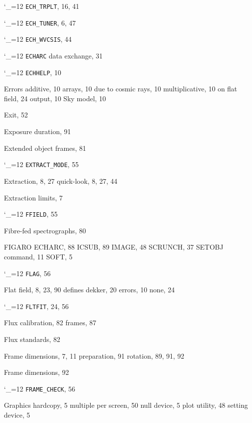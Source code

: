 \documentclass[11pt,twoside]{article}
\newcommand{\cmdname}{\begingroup \catcode`\_=12 \realcmdname}
\newcommand{\realcmdname}[1]{\endgroup\texttt{#1}}
\begin{document}
\begin{theindex}
  \item \cmdname {ECH_TRPLT}, 16, 41
  \item \cmdname {ECH_TUNER}, 6, 47
  \item \cmdname {ECH_WVCSIS}, 44
  \item \cmdname {ECHARC} data exchange, 31
  \item \cmdname {ECHHELP}, 10
  \item Errors
    \subitem additive, 10
    \subitem arrays, 10
    \subitem due to cosmic rays, 10
    \subitem multiplicative, 10
    \subitem on flat field, 24
    \subitem output, 10
    \subitem Sky model, 10
  \item Exit, 52
  \item Exposure duration, 91
  \item Extended object frames, 81
  \item \cmdname {EXTRACT_MODE}, 55
  \item Extraction, 8, 27
    \subitem quick-look, 8, 27, 44
  \item Extraction limits, 7

  \indexspace

  \item \cmdname {FFIELD}, 55
  \item Fibre-fed spectrographs, 80
  \item FIGARO
    \subitem ECHARC, 88
    \subitem ICSUB, 89
    \subitem IMAGE, 48
    \subitem SCRUNCH, 37
    \subitem SETOBJ command, 11
    \subitem SOFT, 5
  \item \cmdname {FLAG}, 56
  \item Flat field, 8, 23, 90
    \subitem defines dekker, 20
    \subitem errors, 10
    \subitem none, 24
  \item \cmdname {FLTFIT}, 24, 56
  \item Flux calibration, 82
    \subitem frames, 87
  \item Flux standards, 82
  \item Frame
    \subitem dimensions, 7, 11
    \subitem preparation, 91
    \subitem rotation, 89, 91, 92
  \item Frame dimensions, 92
  \item \cmdname {FRAME_CHECK}, 56

  \indexspace

  \item Graphics
    \subitem hardcopy, 5
    \subitem multiple per screen, 50
    \subitem null device, 5
    \subitem plot utility, 48
    \subitem setting device, 5


\end{theindex}
\end{document}
